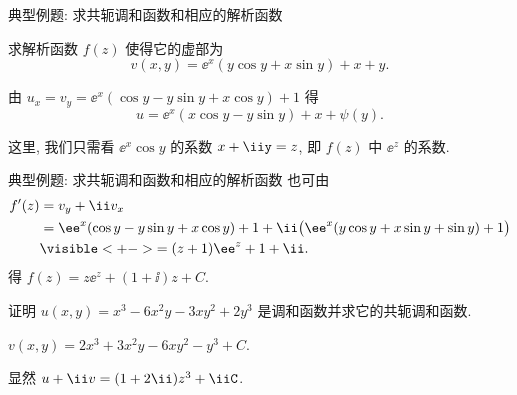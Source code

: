 \begin{frame}{典型例题: 求共轭调和函数和相应的解析函数}
	\beqskip{4pt}
	\onslide<+->
	\begin{example}
		求解析函数 $f(z)$ 使得它的虚部为
	\[
		v(x,y)=\ee^x(y\cos y+x\sin y)+x+y.
	\]
	\end{example}

	\onslide<+->
	\begin{solution}
		由 $u_x=v_y=\ee^x(\cos y-y\sin y+x\cos y)+1$ 得
	\[
			u=\ee^x(x\cos y-y\sin y)+x+\psi(y).
	\]
		\bigdel
	\end{solution}
	\onslide<+->
	这里, 我们只需看 $\ee^x\cos y$ 的系数 $x+\iiy=z$, 即 $f(z)$ 中 $\ee^z$ 的系数.
	\endgroup
\end{frame}


\begin{frame}{典型例题: 求共轭调和函数和相应的解析函数}
	\onslide<+->
	也可由
	\begin{align*}
		f'(z)&=v_y+\ii v_x\\
		&=\ee^x(\cos y-y\sin y+x\cos y)+1
		+\ii\bigl(\ee^x(y\cos y+x\sin y+\sin y)+1\bigr)\\
		&\visible<+->{=(z+1)\ee^z+1+\ii.}
	\end{align*}
	\onslide<+->
	得 $f(z)=z\ee^z+(1+\ii)z+C$.
	\onslide<+->
	\begin{exercise}
		证明 $u(x,y)=x^3-6x^2y-3xy^2+2y^3$ 是调和函数并求它的共轭调和函数.
	\end{exercise}

	\onslide<+->
	\begin{answer}
		$v(x,y)=2x^3+3x^2y-6xy^2-y^3+C$.
	\end{answer}
	\onslide<+->
	显然 $u+\ii v=(1+2\ii)z^3+\iiC$.
\end{frame}

